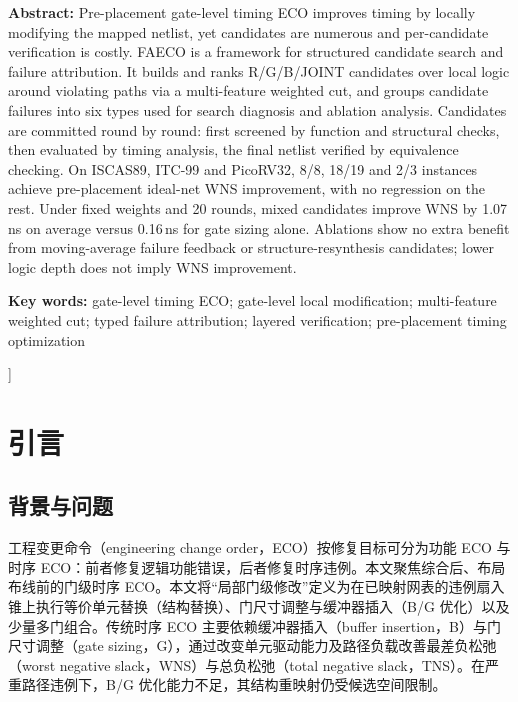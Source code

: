 \documentclass[twocolumn,10pt,fontset=windows]{ctexart}
\begin{document}
\begin{flushleft}
  {\bfseries Abstract:} {\small Pre-placement gate-level timing ECO improves timing by locally modifying the mapped netlist, yet candidates are numerous and per-candidate verification is costly. FAECO is a framework for structured candidate search and failure attribution. It builds and ranks R/G/B/JOINT candidates over local logic around violating paths via a multi-feature weighted cut, and groups candidate failures into six types used for search diagnosis and ablation analysis. Candidates are committed round by round: first screened by function and structural checks, then evaluated by timing analysis, the final netlist verified by equivalence checking. On ISCAS89, ITC-99 and PicoRV32, 8/8, 18/19 and 2/3 instances achieve pre-placement ideal-net WNS improvement, with no regression on the rest. Under fixed weights and 20 rounds, mixed candidates improve WNS by 1.07\,ns on average versus 0.16\,ns for gate sizing alone. Ablations show no extra benefit from moving-average failure feedback or structure-resynthesis candidates; lower logic depth does not imply WNS improvement.}\par
\vspace{3pt}
{\bfseries Key words:} {\small gate-level timing ECO; gate-level local modification; multi-feature weighted cut; typed failure attribution; layered verification; pre-placement timing optimization}\par
\end{flushleft}
]%


\section{引言}

\subsection{背景与问题}
工程变更命令（engineering change order，ECO）按修复目标可分为功能 ECO 与时序 ECO：前者修复逻辑功能错误，后者修复时序违例。本文聚焦综合后、布局布线前的门级时序 ECO。本文将“局部门级修改”定义为在已映射网表的违例扇入锥上执行等价单元替换（结构替换）、门尺寸调整与缓冲器插入（B/G 优化）以及少量多门组合。传统时序 ECO 主要依赖缓冲器插入（buffer insertion，B）与门尺寸调整（gate sizing，G），通过改变单元驱动能力及路径负载改善最差负松弛（worst negative slack，WNS）与总负松弛（total negative slack，TNS）。在严重路径违例下，B/G 优化能力不足，其结构重映射仍受候选空间限制\cite{ho2010eco,liu2021rlsizer,chen2024aito}。
\end{document}
